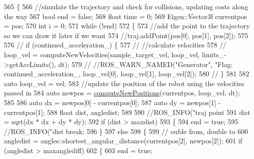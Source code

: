 \begin{DoxyCode}
565         \{
566             \textcolor{comment}{//simulate the trajectory and check for collisions, updating costs along the way}
567             \textcolor{keywordtype}{bool} end = \textcolor{keyword}{false};
568             \textcolor{keywordtype}{float} time = 0;
569             Eigen::Vector3f currentpos = pos;
570             \textcolor{keywordtype}{int} i = 0;
571             \textcolor{keywordflow}{while} (!end)
572             \{
573                 \textcolor{comment}{//add the point to the trajectory so we can draw it later if we want}
574                 \textcolor{comment}{//traj.addPoint(pos[0], pos[1], pos[2]);}
575 
576                 \textcolor{comment}{// if (continued\_acceleration\_) \{}
577                 \textcolor{comment}{//   //calculate velocities}
578                 \textcolor{comment}{//   loop\_vel = computeNewVelocities(sample\_target\_vel, loop\_vel, limits\_->getAccLimits(),
       dt);}
579                 \textcolor{comment}{//   //ROS\_WARN\_NAMED("Generator", "Flag: %
       continued\_acceleration\_, loop\_vel[0], loop\_vel[1], loop\_vel[2]);}
580                 \textcolor{comment}{// \}}
581 
582                 \textcolor{keyword}{auto} loop\_vel = vel;
583                 \textcolor{comment}{//update the position of the robot using the velocities passed in}
584                 \textcolor{keyword}{auto} newpos = \hyperlink{classcl__move__base__z_1_1backward__local__planner_1_1BackwardLocalPlanner_a0fe2ebd23fd79e8b574127e819ef0e14}{computeNewPositions}(currentpos, loop\_vel, dt);
585 
586                 \textcolor{keyword}{auto} dx = newpos[0] - currentpos[0];
587                 \textcolor{keyword}{auto} dy = newpos[1] - currentpos[1];
588                 \textcolor{keywordtype}{float} dist, angledist;
589 
590                 \textcolor{comment}{//ROS\_INFO("traj point %
591                 dist = sqrt(dx * dx + dy * dy);
592                 \textcolor{keywordflow}{if} (dist > maxdist)
593                 \{
594                     end = \textcolor{keyword}{true};
595                     \textcolor{comment}{//ROS\_INFO("dist break: %
596                 \}
597                 \textcolor{keywordflow}{else}
598                 \{
599                     \textcolor{comment}{// ouble from, double to}
600                     angledist = angles::shortest\_angular\_distance(currentpos[2], newpos[2]);
601                     \textcolor{keywordflow}{if} (angledist > maxanglediff)
602                     \{
603                         end = \textcolor{keyword}{true};
}}
\end{DoxyCode}
